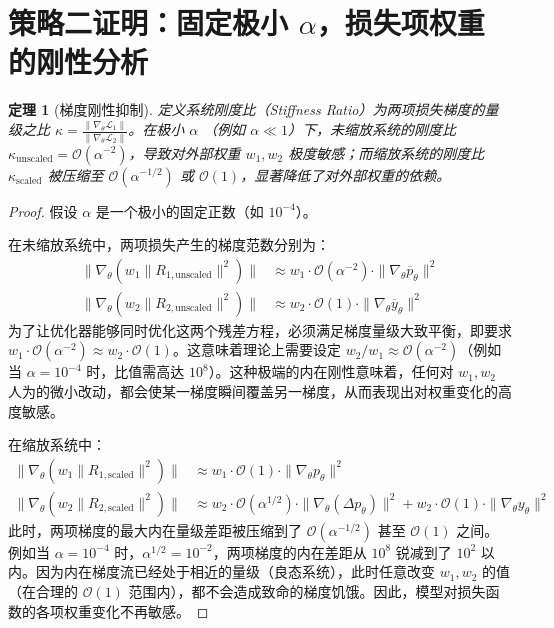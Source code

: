\documentclass[a4paper, 11pt]{ctexart}
\newtheorem{theorem}{定理}
\begin{document}
\section{策略二证明：固定极小 $\alpha$，损失项权重的刚性分析}

\begin{theorem}[梯度刚性抑制]
定义系统刚度比（Stiffness Ratio）为两项损失梯度的量级之比 $\kappa = \frac{\| \nabla_\theta \mathcal{L}_1 \|}{\| \nabla_\theta \mathcal{L}_2 \|}$。在极小 $\alpha$ （例如 $\alpha \ll 1$）下，未缩放系统的刚度比 $\kappa_{\text{unscaled}} = \mathcal{O}(\alpha^{-2})$，导致对外部权重 $w_1, w_2$ 极度敏感；而缩放系统的刚度比 $\kappa_{\text{scaled}}$ 被压缩至 $\mathcal{O}(\alpha^{-1/2})$ 或 $\mathcal{O}(1)$，显著降低了对外部权重的依赖。
\end{theorem}

\begin{proof}
假设 $\alpha$ 是一个极小的固定正数（如 $10^{-4}$）。

在未缩放系统中，两项损失产生的梯度范数分别为：
\begin{align}
    \| \nabla_\theta (w_1 \|R_{1, \text{unscaled}}\|^2) \| &\approx w_1 \cdot \mathcal{O}(\alpha^{-2}) \cdot \| \nabla_\theta \overline{p}_\theta \|^2 \\
    \| \nabla_\theta (w_2 \|R_{2, \text{unscaled}}\|^2) \| &\approx w_2 \cdot \mathcal{O}(1) \cdot \| \nabla_\theta \overline{y}_\theta \|^2
\end{align}
为了让优化器能够同时优化这两个残差方程，必须满足梯度量级大致平衡，即要求 $w_1 \cdot \mathcal{O}(\alpha^{-2}) \approx w_2 \cdot \mathcal{O}(1)$。这意味着理论上需要设定 $w_2 / w_1 \approx \mathcal{O}(\alpha^{-2})$（例如当 $\alpha=10^{-4}$ 时，比值需高达 $10^8$）。这种极端的内在刚性意味着，任何对 $w_1, w_2$ 人为的微小改动，都会使某一梯度瞬间覆盖另一梯度，从而表现出对权重变化的高度敏感。

在缩放系统中：
\begin{align}
    \| \nabla_\theta (w_1 \|R_{1, \text{scaled}}\|^2) \| &\approx w_1 \cdot \mathcal{O}(1) \cdot \| \nabla_\theta p_\theta \|^2 \\
    \| \nabla_\theta (w_2 \|R_{2, \text{scaled}}\|^2) \| &\approx w_2 \cdot \mathcal{O}(\alpha^{1/2}) \cdot \| \nabla_\theta (\Delta p_\theta) \|^2 + w_2 \cdot \mathcal{O}(1) \cdot \| \nabla_\theta y_\theta \|^2
\end{align}
此时，两项梯度的最大内在量级差距被压缩到了 $\mathcal{O}(\alpha^{-1/2})$ 甚至 $\mathcal{O}(1)$ 之间。例如当 $\alpha=10^{-4}$ 时，$\alpha^{1/2} = 10^{-2}$，两项梯度的内在差距从 $10^8$ 锐减到了 $10^2$ 以内。因为内在梯度流已经处于相近的量级（良态系统），此时任意改变 $w_1, w_2$ 的值（在合理的 $\mathcal{O}(1)$ 范围内），都不会造成致命的梯度饥饿。因此，模型对损失函数的各项权重变化不再敏感。
\end{proof}
\end{document}
